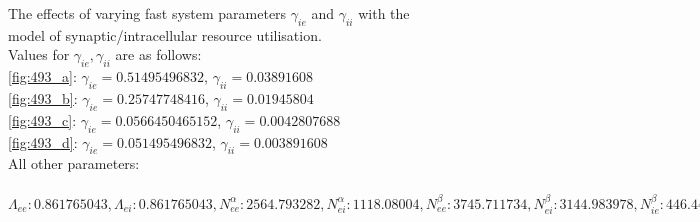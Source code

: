 \documentclass[a4paper,12pt]{article}
\begin{document}
\begin{figure}
	\label{fig:intra_gamma}
	\caption{The effects of varying fast system parameters $\gamma_{ie}$ and $\gamma_{ii}$ with the model of synaptic/intracellular resource utilisation. \\
	Values for $\gamma_{ie}, \gamma_{ii}$ are as follows: \\
\ref{fig:493_a}: $\gamma_{ie}=0.51495496832$, $\gamma_{ii}=0.03891608$ \\
\ref{fig:493_b}: $\gamma_{ie}=0.25747748416$, $\gamma_{ii}=0.01945804$ \\
\ref{fig:493_c}: $\gamma_{ie}=0.0566450465152$, $\gamma_{ii}=0.0042807688$ \\
\ref{fig:493_d}: $\gamma_{ie}=0.051495496832$, $\gamma_{ii}=0.003891608$ \\
All other parameters:\\ \\
$\Lambda_{ee}: 0.861765043, \Lambda_{ei}: 0.861765043, N^{\alpha}_{ee}: 2564.793282, N^{\alpha}_{ei}: 1118.08004, N^{\beta}_{ee}: 3745.711734, N^{\beta}_{ei}: 3144.983978, N^{\beta}_{ie}: 446.4477283, N^{\beta}_{ii}: 345.8866865, \Gamma_{ee}: 1.6861042005, \Gamma_{ei}: 1.885871361, \hat{\Gamma_{ie}}: 5.855116285, \hat{\Gamma_{ii}}: 6.9331585350000005, g_e: 0.7, \gamma_{ee}: 0.95083473, \gamma_{ei}: 0.79156622, \chi_{ee}: 700.0, \chi_{ei}: 700.0, h^{rest}_e: -79.61058688, h^{eq}_{ee}: -17.9914286, h^{eq}_{ei}: -15.53827744, h^{rest}_i: -71.24328917, h^{eq}_{ie}: -84.00936425, h^{eq}_{ii}: -89.797995, \mu_e: -41.12042539, \mu_i: -54.45064422, p_{ee}: 2.6864898634, p_{ei}: 6.648040185, p_{ie}: 0.0, p_{ii}: 0.0, \phi_{ie}: 0, \phi_{ii}: 0, r^{abs}: 0.0, S^{max}_e: 0.400558, S^{max}_i: 0.404191, \sigma_e: 6.55747395, \sigma_i: 2.047597811, \tau_e: 108.758, \tau_i: 232.0, \tau^{slow}_e: 5437.9, v_{ee}: 0.419426, v_{ei}: 0.419426$
}
\end{figure}
\end{document}
